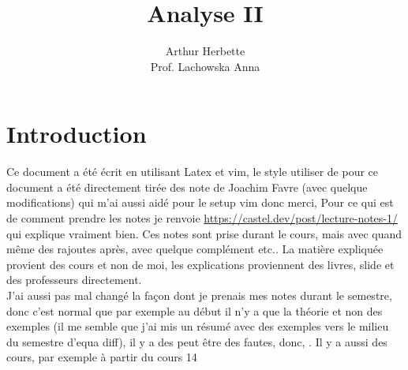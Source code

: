 \documentclass[11pt]{book}
\title{Analyse II}
\author{Arthur Herbette \\
Prof. Lachowska Anna}
\begin{document}
\setcounter{section}{8}
\maketitle

\thispagestyle{empty}
\tableofcontents
\thispagestyle{empty}
\listoflectures

\chapter{Introduction}
Ce document a été écrit en utilisant Latex et vim, le style utiliser de pour ce document a été directement tirée des note de Joachim Favre (avec quelque modifications) qui m'ai aussi aidé pour le setup vim donc merci, Pour ce qui est de comment prendre les notes je renvoie \url{https://castel.dev/post/lecture-notes-1/} qui explique vraiment bien. Ces notes sont prise durant le cours, mais avec quand même des rajoutes après, avec quelque complément etc.. La matière expliquée provient des cours et non de moi, les explications proviennent des livres, slide et des professeurs directement.\\

J'ai aussi pas mal changé la façon dont je prenais mes notes durant le semestre, donc c'est normal que par exemple au début il n'y a que la théorie et non des exemples (il me semble que j'ai mis un résumé avec des exemples vers le milieu du semestre d'equa diff), il y a des peut être des fautes, donc, . Il y a aussi des cours, par exemple à partir du cours 14




























\end{document}
